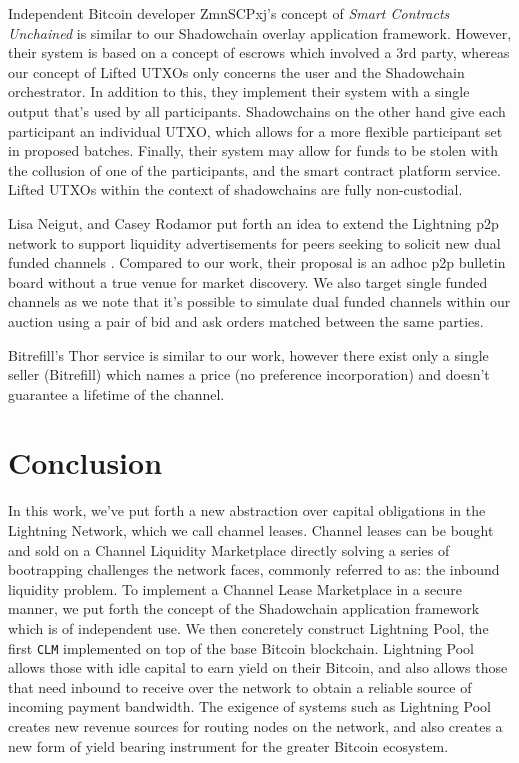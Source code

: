 \documentclass[10pt,a4paper]{article}
\theoremstyle{definition}
\begin{document}
Independent Bitcoin developer ZmnSCPxj's concept of \textit{Smart Contracts
Unchained} \cite{zContracts} is similar to our Shadowchain overlay application
framework.  However, their system is based on a concept of escrows which
involved a 3rd party, whereas our concept of Lifted UTXOs only concerns the
user and the Shadowchain orchestrator. In addition to this, they implement
their system with a single output that's used by all participants. Shadowchains
on the other hand give each participant an individual UTXO, which allows for a
more flexible participant set in proposed batches. Finally, their system may
allow for funds to be stolen with the collusion of one of the participants, and
the smart contract platform service. Lifted UTXOs within the context of
shadowchains are fully non-custodial.

Lisa Neigut, and Casey Rodamor put forth an idea to extend the Lightning p2p
network to support liquidity advertisements for peers seeking to solicit new
dual funded channels \cite{lisaLiquidity}. Compared to our work, their proposal
is an adhoc p2p bulletin board without a true venue for market discovery. We
also target single funded channels as we note that it's possible to simulate
dual funded channels within our auction using a pair of bid and ask orders
matched between the same parties.

Bitrefill's Thor \cite{bitThor} service is similar to our work, however there
exist only a single seller (Bitrefill) which names a price (no preference
incorporation) and doesn't guarantee a lifetime of the channel.

\section{Conclusion}

In this work, we've put forth a new abstraction over capital obligations in the
Lightning Network, which we call channel leases. Channel leases can be bought
and sold on a Channel Liquidity Marketplace directly solving a series of
bootrapping challenges the network faces, commonly referred to as: the inbound
liquidity problem. To implement a Channel Lease Marketplace in a secure manner,
we put forth the concept of the Shadowchain application framework which is of
independent use.  We then concretely construct Lightning Pool, the first
\texttt{CLM} implemented on top of the base Bitcoin blockchain. Lightning Pool
allows those with idle capital to earn yield on their Bitcoin, and also allows
those that need inbound to receive over the network to obtain a reliable source
of incoming payment bandwidth. The exigence of systems such as Lightning Pool
creates new revenue sources for routing nodes on the network, and also creates
a new form of yield bearing instrument for the greater Bitcoin ecosystem.
\end{document}
